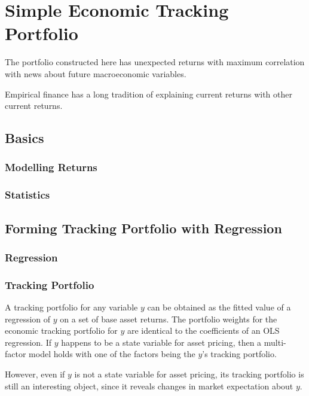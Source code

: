 \chapter{Simple Economic Tracking Portfolio}

The portfolio constructed 
here has unexpected returns with maximum correlation 
with news about future macroeconomic variables.

Empirical finance has a long tradition of explaining 
current returns with other current returns. 

\section{Basics}

\subsection{Modelling Returns}

\subsection{Statistics}

\section{Forming Tracking Portfolio with Regression}


\subsection{Regression}

\subsection{Tracking Portfolio}

A tracking portfolio for any variable $y$ can be obtained 
as the fitted value of a regression of $y$ on a set of 
base asset returns. The portfolio weights for the economic 
tracking portfolio for $y$ are identical to the coefficients of 
an OLS regression. If $y$ happens to be a state variable 
for asset pricing, then a multi-factor model holds with 
one of the factors being the $y$'s tracking portfolio.

However, even if $y$ is not a state variable for asset pricing, 
its tracking portfolio is still an interesting object, since 
it reveals changes in market expectation about $y$.

